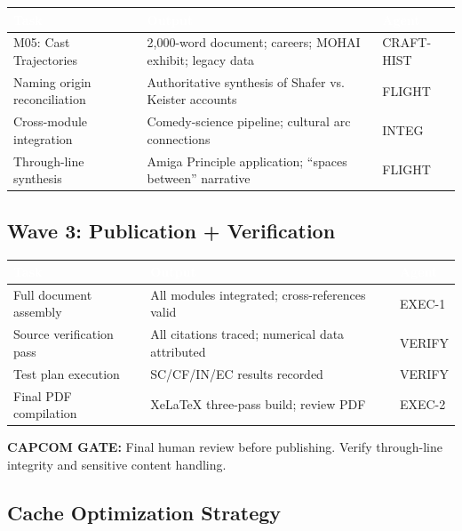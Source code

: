 \documentclass[11pt,letterpaper]{article}
\newcommand{\tableheader}[1]{\textbf{\sffamily\textcolor{white}{#1}}}
\begin{document}
\begin{center}
\begin{tabularx}{\textwidth}{L{3.5cm}XC{2cm}}
\toprule
{}
\tableheader{Task} & \tableheader{Output} & \tableheader{Agent} \\
\midrule
M05: Cast Trajectories & 2,000-word document; careers; MOHAI exhibit; legacy data & CRAFT-HIST \\
Naming origin reconciliation & Authoritative synthesis of Shafer vs. Keister accounts & FLIGHT \\
Cross-module integration & Comedy-science pipeline; cultural arc connections & INTEG \\
Through-line synthesis & Amiga Principle application; ``spaces between'' narrative & FLIGHT \\
\bottomrule
\end{tabularx}
\end{center}

\subsection{Wave 3: Publication + Verification}

\begin{center}
\begin{tabularx}{\textwidth}{L{3.5cm}XC{2cm}}
\toprule
{}
\tableheader{Task} & \tableheader{Output} & \tableheader{Agent} \\
\midrule
Full document assembly & All modules integrated; cross-references valid & EXEC-1 \\
Source verification pass & All citations traced; numerical data attributed & VERIFY \\
Test plan execution & SC/CF/IN/EC results recorded & VERIFY \\
Final PDF compilation & XeLaTeX three-pass build; review PDF & EXEC-2 \\
\bottomrule
\end{tabularx}
\end{center}

\textbf{CAPCOM GATE:} Final human review before publishing. Verify through-line integrity and sensitive content handling.

\subsection{Cache Optimization Strategy}
\end{document}
